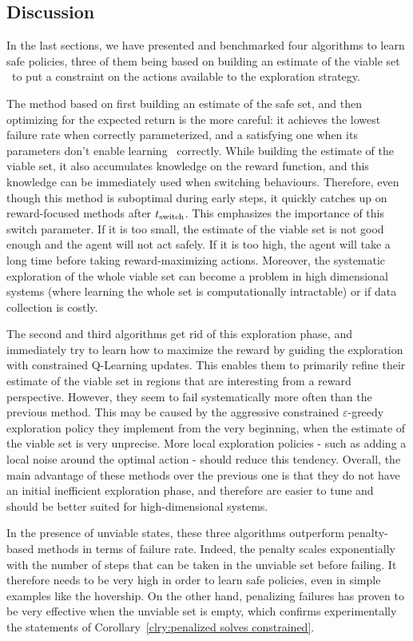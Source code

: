 \subsection{Discussion}
In the last sections, we have presented and benchmarked four algorithms to learn safe policies, three of them being based on building an estimate of the viable set \QV~to put a constraint on the actions available to the exploration strategy.\par
The method based on first building an estimate of the safe set, and then optimizing for the expected return is the more careful: it achieves the lowest failure rate when correctly parameterized, and a satisfying one when its parameters don't enable learning \QV~correctly. While building the estimate of the viable set, it also accumulates knowledge on the reward function, and this knowledge can be immediately used when switching behaviours. Therefore, even though this method is suboptimal during early steps, it quickly catches up on reward-focused methods after $t_\text{switch}$. This emphasizes the importance of this switch parameter. If it is too small, the estimate of the viable set is not good enough and the agent will not act safely. If it is too high, the agent will take a long time before taking reward-maximizing actions. Moreover, the systematic exploration of the whole viable set can become a problem in high dimensional systems (where learning the whole set is computationally intractable) or if data collection is costly. \par
The second and third algorithms get rid of this exploration phase, and immediately try to learn how to maximize the reward by guiding the exploration with constrained Q-Learning updates. This enables them to primarily refine their estimate of the viable set in regions that are interesting from a reward perspective. However, they seem to fail systematically more often than the previous method. This may be caused by the aggressive constrained $\varepsilon$-greedy exploration policy they implement from the very beginning, when the estimate of the viable set is very unprecise. More local exploration policies - such as adding a local noise around the optimal action - should reduce this tendency. Overall, the main advantage of these methods over the previous one is that they do not have an initial inefficient exploration phase, and therefore are easier to tune and should be better suited for high-dimensional systems.\par
In the presence of unviable states, these three algorithms outperform penalty-based methods in terms of failure rate. Indeed, the penalty scales exponentially with the number of steps that can be taken in the unviable set before failing. It therefore needs to be very high in order to learn safe policies, even in simple examples like the hovership. On the other hand, penalizing failures has proven to be very effective when the unviable set is empty, which confirms experimentally the statements of Corollary~\ref{clry:penalized solves constrained}.\par
